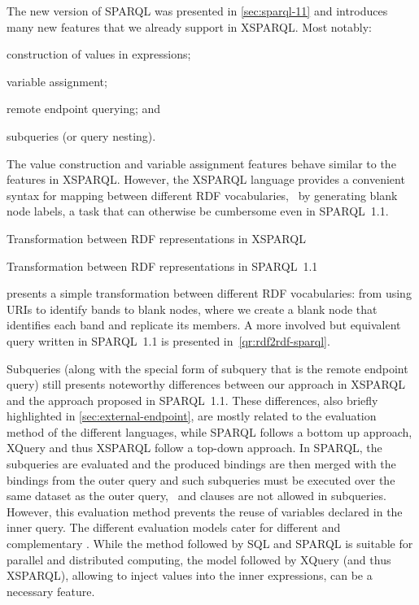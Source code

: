 The new version of SPARQL was presented in \cref{sec:sparql-11} and introduces many new features that we already
support in XSPARQL.
%
Most notably:
%
\begin{enumerate*}[label=(\roman*), noitemsep]
\item construction of values in \SELECT expressions;
\item variable assignment;
\item remote endpoint querying; and
\item subqueries (or query nesting).
\end{enumerate*}
%
The value construction and variable assignment features behave similar to the features in XSPARQL. 
%
However, the XSPARQL language provides a convenient syntax for mapping between different \ac{RDF} vocabularies, \eg~by
generating blank node labels, a task that can otherwise be cumbersome even in SPARQL~1.1.
% 
\begin{query}
  \caption{Transformation between RDF representations in XSPARQL}%
  \label{qr:rdf2rdf-xsparql}%
\end{query}
%
\begin{query}
  \caption{Transformation between RDF representations in SPARQL~1.1}%
  \label{qr:rdf2rdf-sparql}%
\end{query}
%
\begin{example}
   presents a simple transformation between different \ac{RDF} vocabularies: from using
  \acp{URI} to identify bands to blank nodes, where we create a blank node that identifies each band and replicate its
  members.
  A more involved but equivalent query written in SPARQL~1.1 is presented in~\cref{qr:rdf2rdf-sparql}.
\end{example}
%
Subqueries (along with the special form of subquery that is the remote endpoint query) still presents noteworthy
differences between our approach in XSPARQL and the approach proposed in SPARQL~1.1.
%
These differences, also briefly highlighted in \cref{sec:external-endpoint}, are mostly related to the evaluation
method of the different languages, while SPARQL follows a bottom up approach, XQuery and thus XSPARQL follow a top-down
approach.
%
In SPARQL, the subqueries are evaluated and the produced bindings are then merged with the bindings from the outer query and
such subqueries must be executed over the same dataset as the outer query, \ie~\FROM and \FROMNAMED clauses are not
allowed in subqueries.
%
However, this evaluation method prevents the reuse of variables declared in the inner query.
%
The different evaluation models cater for different and complementary \usecases.  While the method followed by \ac{SQL}
and SPARQL is suitable for parallel and distributed computing, the model followed by XQuery (and thus XSPARQL), allowing
to inject values into the inner expressions, can be a necessary feature.


